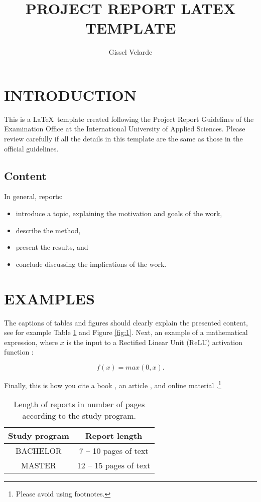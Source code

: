 \documentclass[11pt,a4paper]{article}
\title{PROJECT REPORT LATEX TEMPLATE}
\author{ Gissel Velarde }
\begin{document}
\maketitle	

 \tableofcontents
 \pagebreak

\section{INTRODUCTION}
This is a \LaTeX\  template created following the Project Report Guidelines of the Examination Office at the International University of Applied Sciences. Please review carefully if all the details in this template are the same as those in the official guidelines. 

\subsection{Content}
In general, reports:

\begin{itemize}
\item introduce a topic, explaining the motivation and goals of the work, 
\item describe the method, 
\item  present the results, and
\item conclude discussing the implications of the work.
\end{itemize}

\section{EXAMPLES}
The captions of tables and figures should clearly explain the presented content, see for example Table \ref{table:1} and Figure \ref{fig:1}. Next, an example of a mathematical expression, where $x$ is the input to a Rectified Linear Unit (ReLU) activation function :

\begin{equation} \label{e:1}
f(x)=max(0,x). 
\end{equation}

Finally, this is how you cite a book , an article \cite{lecun1989handwritten}, and online material \cite{Stutz2022}.\footnote{Please avoid using footnotes.} 

\begin{table}[h!]
\centering
\begin{tabular}{|c c|} 
 \hline
Study program &  Report length \\  \hline
BACHELOR &  7 -- 10  pages of text  \\ 
MASTER  & 12 -- 15 pages of text\\

 \hline
\end{tabular}
\caption{Length of reports in number of pages according to the study program.}
\label{table:1}
\end{table}
\end{document}
